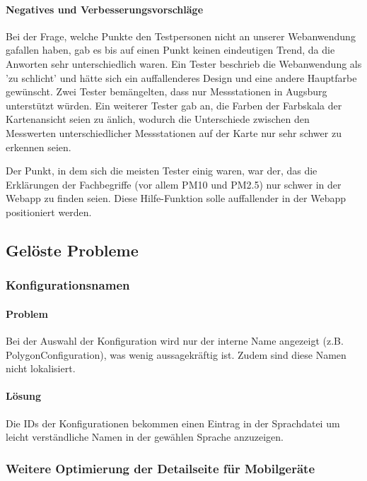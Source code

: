       \paragraph{Negatives und Verbesserungsvorschläge}
        Bei der Frage, welche Punkte den Testpersonen nicht an unserer Webanwendung gafallen haben, gab es bis auf einen Punkt keinen eindeutigen Trend, da die Anworten sehr unterschiedlich waren.
        Ein Tester beschrieb die Webanwendung als 'zu schlicht' und hätte sich ein auffallenderes Design und eine andere Hauptfarbe gewünscht.
        Zwei Tester bemängelten, dass nur Messstationen in Augsburg unterstützt würden.
        Ein weiterer Tester gab an, die Farben der Farbskala der Kartenansicht seien zu änlich, wodurch die Unterschiede zwischen den Messwerten unterschiedlicher Messstationen auf der Karte nur sehr schwer zu erkennen seien.
        
        Der Punkt, in dem sich die meisten Tester einig waren, war der, das die Erklärungen der Fachbegriffe (vor allem PM10 und PM2.5) nur schwer in der Webapp zu finden seien. Diese Hilfe-Funktion solle auffallender in der Webapp positioniert werden.

  \subsection{Gelöste Probleme}
    \subsubsection*{Konfigurationsnamen}
      \paragraph{Problem}
      Bei der Auswahl der Konfiguration wird nur der interne Name angezeigt (z.B. PolygonConfiguration),
      was wenig aussagekräftig ist. Zudem sind diese Namen nicht lokalisiert.

      \paragraph{Lösung}
      Die IDs der Konfigurationen bekommen einen Eintrag in der Sprachdatei um leicht verständliche
      Namen in der gewählen Sprache anzuzeigen.

    \subsubsection*{Weitere Optimierung der Detailseite für Mobilgeräte}

